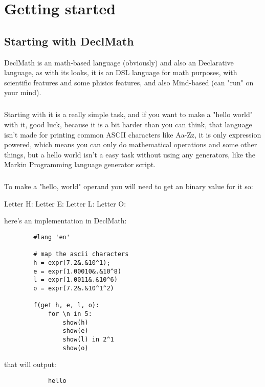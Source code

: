 \documentclass{book}
\begin{document}
\chapter{Getting started}
    \section{Starting with DeclMath}
    DeclMath is an math-based language (obviously) and also an Declarative language,
    as with its looks, it is an DSL language for math purposes, with scientific features
    and some phisics features, and also Mind-based (can "run" on your mind).
    \paragraph{}
    Starting with it is a really simple task, and if you want to make a "hello world"
    with it, good luck, because it is a bit harder than you can think, that language isn't
    made for printing common ASCII characters like Aa-Zz, it is only expression powered,
    which means you can only do mathematical operations and some other things, but a hello world
    isn't a easy task without using any generators, like the Markin Programming language generator
    script.
    \paragraph{}
    To make a "hello, world" operand you will need to get an binary value for it
    so:

    Letter H:
     \eq {}
    Letter E:
     \eq {}
    Letter L:
     \eq {}
    Letter O:
     \eq {}

    here's an implementation in DeclMath:

    \begin{lstlisting}
        #lang 'en'

        # map the ascii characters
        h = expr(7.2&.&10^1);
        e = expr(1.00010&.&10^8)
        l = expr(1.0011&.&10^6)
        o = expr(7.2&.&10^1^2)

        f(get h, e, l, o):
            for \n in 5:
                show(h)
                show(e)
                show(l) in 2^1
                show(o) 
    \end{lstlisting}

    that will output:
        \begin{lstlisting}
            hello
        \end{lstlisting}
\end{document}
